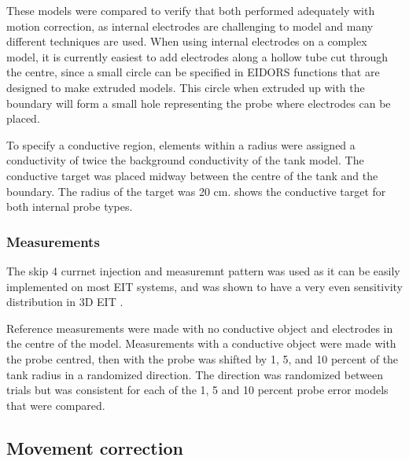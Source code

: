 These models were compared to verify that both 
performed adequately with motion correction, as internal electrodes 
are challenging to model and many different techniques are used. 
When using internal electrodes on a complex model, it is currently easiest 
to add electrodes along a hollow tube cut through the centre, since 
a small circle can be specified in EIDORS functions that are designed to make extruded 
models. This circle when extruded up with the boundary will form a small hole representing 
the probe where electrodes can be placed.

To specify a conductive region, elements within a radius were assigned a conductivity 
of twice the background conductivity of the tank model.
The conductive target was placed midway between the centre of the tank and the boundary. 
The radius of the target was 20 cm. 
 shows the conductive target for both internal probe types.

\subsubsection{Measurements}
The skip 4 currnet injection and measuremnt pattern was used as it can be 
easily implemented on most EIT systems, and was shown to have a very even 
sensitivity distribution in 3D EIT \parencite{grychtol_3d_2016}.

Reference measurements were made with no conductive object and 
electrodes in the centre of the model. Measurements with a conductive object were made 
with the probe centred, then
with the probe was shifted by 1, 5, and 10 percent of the tank radius in a randomized 
direction. The direction was randomized between trials but was consistent for 
each of the 1, 5 and 10 percent probe error models that were compared. 

\subsection{Movement correction}
\label{sec:3_methods}

